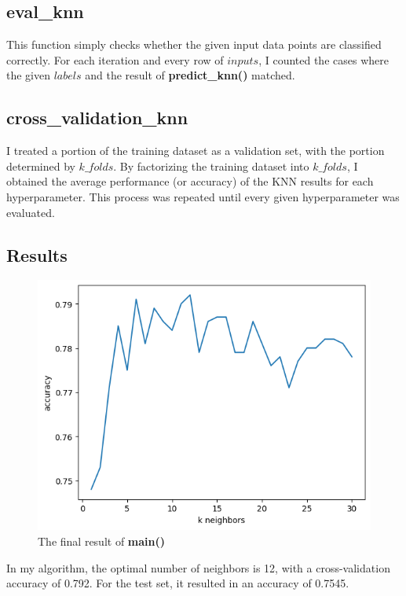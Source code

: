 \documentclass[12pt]{article}
\begin{document}
\subsection{eval\_knn}

This function simply checks whether the given input data points are classified correctly. For each iteration and every row of $inputs$, I counted the cases where the given $labels$ and the result of \textbf{predict\_knn()} matched.

\subsection{cross\_validation\_knn}

I treated a portion of the training dataset as a validation set, with the portion determined by $k\_folds$. By factorizing the training dataset into $k\_folds$, I obtained the average performance (or accuracy) of the KNN results for each hyperparameter. This process was repeated until every given hyperparameter was evaluated.

\subsection{Results}

\begin{figure}[!h]
    \centering
    \includegraphics[scale=0.5]{./figures/output.png}
    \caption{The final result of \textbf{main()}}
\end{figure}

In my algorithm, the optimal number of neighbors is 12, with a cross-validation accuracy of 0.792. For the test set, it resulted in an accuracy of 0.7545.
\end{document}
